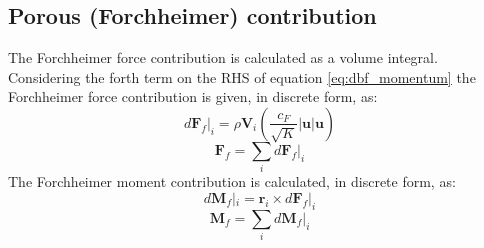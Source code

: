 \documentclass[a4paper,11pt]{report}
\begin{document}
\subsection{Porous (Forchheimer) contribution} \label{subsec:Forchheimer}
The Forchheimer force contribution is calculated as a volume integral. Considering the forth term on the RHS of equation \ref{eq:dbf_momentum} the Forchheimer force contribution is given, in discrete form, as:
\begin{equation}
    d\mathbf{F}_f|_i = \rho\mathbf{V}_i(\frac{c_{F}}{\sqrt{K}}\lvert\mathbf{u}\rvert\mathbf{u})
    \label{eq:dFfi}
\end{equation}
\begin{equation}
    \mathbf{F}_f = \sum_i d\mathbf{F}_f|_i
    \label{eq:Ff}
\end{equation}
The Forchheimer moment contribution is calculated, in discrete form, as:
\begin{equation}
    d\mathbf{M}_f|_i = \mathbf{r}_i\times d\mathbf{F}_f|_i
    \label{eq:dMfi}
\end{equation}
\begin{equation}
    \mathbf{M}_f = \sum_i d\mathbf{M}_f|_i
    \label{eq:Mf}
\end{equation}
\end{document}
